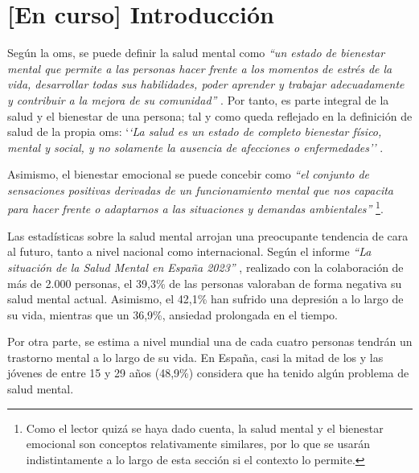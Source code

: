 \chapter{[En curso] Introducción}
\label{chapter:introduccion}



Según la \gls{oms}, se puede definir la salud mental como \textit{``un estado de bienestar mental que permite a las personas hacer frente a los momentos de estrés de la vida, desarrollar todas sus habilidades, poder aprender y trabajar adecuadamente y contribuir a la mejora de su comunidad''} \cite{oms_salud_2022}. Por tanto, es parte integral de la salud y el bienestar de una persona; tal y como queda reflejado en la definición de salud de la propia \gls{oms}: `\textit{`La salud es un estado de completo bienestar físico, mental y social, y no solamente la ausencia de afecciones o enfermedades''} \cite{feafes_galicia_que_nodate}.

Asimismo, el bienestar emocional se puede concebir como \textit{``el conjunto de sensaciones positivas derivadas de un funcionamiento mental que nos capacita para hacer frente o adaptarnos a las situaciones y demandas ambientales''} \cite{clinic_barcelona_que_nodate}  \footnote{Como el lector quizá se haya dado cuenta, la salud mental y el bienestar emocional son conceptos relativamente similares, por lo que se usarán indistintamente a lo largo de esta sección si el contexto lo permite.}.

Las estadísticas sobre la salud mental arrojan una preocupante tendencia de cara al futuro, tanto a nivel nacional como internacional. Según el informe \textit{``La situación de la Salud Mental en España 2023''} \cite{comunicacion_cuatro_2023}, realizado con la colaboración de más de 2.000 personas, el 39,3\% de las personas valoraban de forma negativa su salud mental actual. Asimismo, el 42,1\% han sufrido una depresión a lo largo de su vida, mientras que un 36,9\%, ansiedad prolongada en el tiempo. 

Por otra parte, se estima a nivel mundial una de cada cuatro personas tendrán un trastorno mental a lo largo de su vida. En España, casi la mitad de los y las jóvenes de entre 15 y 29 años (48,9\%) considera que ha tenido algún problema de salud mental.

